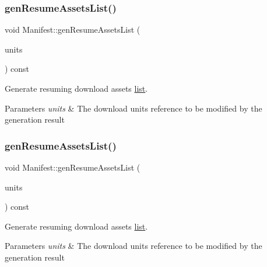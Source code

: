 \subsubsection{\texorpdfstring{gen\+Resume\+Assets\+List()}{genResumeAssetsList()}\hspace{0.1cm}{\footnotesize\ttfamily [1/2]}}
{\footnotesize\ttfamily void Manifest\+::gen\+Resume\+Assets\+List (\begin{DoxyParamCaption}\item[{Download\+Units $\ast$}]{units }\end{DoxyParamCaption}) const\hspace{0.3cm}{\ttfamily [protected]}}



Generate resuming download assets \hyperlink{protocollist-p}{list}. 


\begin{DoxyParams}{Parameters}
{\em units} & The download units reference to be modified by the generation result \\
\hline
\end{DoxyParams}
\mbox{\label{classManifest_a864bd328575f36a37733ab13ba5e5df0}} 
\subsubsection{\texorpdfstring{gen\+Resume\+Assets\+List()}{genResumeAssetsList()}\hspace{0.1cm}{\footnotesize\ttfamily [2/2]}}
{\footnotesize\ttfamily void Manifest\+::gen\+Resume\+Assets\+List (\begin{DoxyParamCaption}\item[{Download\+Units $\ast$}]{units }\end{DoxyParamCaption}) const\hspace{0.3cm}{\ttfamily [protected]}}



Generate resuming download assets \hyperlink{protocollist-p}{list}. 


\begin{DoxyParams}{Parameters}
{\em units} & The download units reference to be modified by the generation result \\
\hline
\end{DoxyParams}
\mbox{\label{classManifest_a6a2c750cb797d4b81d7ec180096a8817}} 
